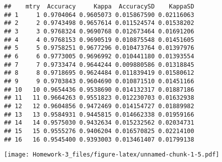 \documentclass[]{article}
\newenvironment{Shaded}{\begin{snugshade}}{\end{snugshade}}
\newcommand{\CommentTok}[1]{\textcolor[rgb]{0.56,0.35,0.01}{\textit{#1}}}
\newcommand{\DataTypeTok}[1]{\textcolor[rgb]{0.13,0.29,0.53}{#1}}
\newcommand{\DecValTok}[1]{\textcolor[rgb]{0.00,0.00,0.81}{#1}}
\newcommand{\KeywordTok}[1]{\textcolor[rgb]{0.13,0.29,0.53}{\textbf{#1}}}
\newcommand{\NormalTok}[1]{#1}
\newcommand{\OperatorTok}[1]{\textcolor[rgb]{0.81,0.36,0.00}{\textbf{#1}}}
\newcommand{\StringTok}[1]{\textcolor[rgb]{0.31,0.60,0.02}{#1}}
\begin{document}
\begin{verbatim}
##    mtry  Accuracy     Kappa  AccuracySD    KappaSD
## 1     1 0.9704064 0.9605073 0.015867590 0.02116063
## 2     2 0.9743498 0.9657614 0.011524574 0.01538202
## 3     3 0.9768324 0.9690768 0.012673464 0.01691206
## 4     4 0.9768153 0.9690519 0.010875548 0.01451605
## 5     5 0.9758251 0.9677296 0.010473764 0.01397976
## 6     6 0.9773005 0.9696992 0.010441180 0.01393554
## 7     7 0.9733474 0.9644244 0.009880586 0.01318845
## 8     8 0.9718695 0.9624484 0.011839419 0.01580612
## 9     9 0.9703843 0.9604690 0.010871510 0.01451166
## 10   10 0.9654436 0.9538690 0.014132317 0.01887186
## 11   11 0.9664263 0.9551823 0.012230703 0.01632938
## 12   12 0.9604856 0.9472469 0.014154727 0.01889982
## 13   13 0.9584931 0.9445815 0.014662338 0.01959166
## 14   14 0.9575030 0.9432634 0.015232562 0.02034731
## 15   15 0.9555276 0.9406204 0.016570825 0.02214100
## 16   16 0.9545400 0.9393003 0.013461407 0.01799138
\end{verbatim}

\begin{Shaded}
\end{Shaded}

\texttt{[image: Homework-3\_files/figure-latex/unnamed-chunk-1-5.pdf]}

\begin{Shaded}
\end{Shaded}
\end{document}
